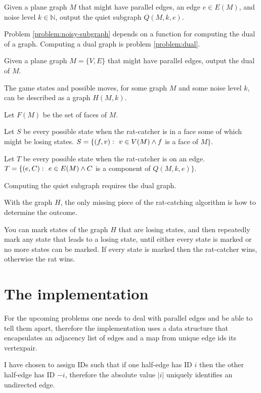 \documentclass{article}
\begin{document}
	\begin{problem}\label{problem:noisy-subgraph}
		Given a plane graph $M$ that might have parallel edges, an edge $e \in E(M)$, and noise level $k \in \mathbb{N}$, output the quiet subgraph $Q(M, k, e)$.
	\end{problem}

	Problem \ref{problem:noisy-subgraph} depends on a function for computing the dual of a graph. Computing a dual graph is problem \ref{problem:dual}.

	\begin{problem}\label{problem:dual}
		Given a plane graph $M = \{V, E\}$ that might have parallel edges, output the dual of $M$.
	\end{problem}

	

	The game states and possible moves, for some graph $M$ and some noise level $k$, can be described as a graph $H(M, k)$.

	Let $F(M)$ be the set of faces of $M$.

	Let $S$ be every possible state when the rat-catcher is in a face some of which might be losing states. $S = \{ (f, v) \,\colon\  v \in V(M) \land f$ is a face of $ M \}$.

	Let $T$ be every possible state when the rat-catcher is on an edge. $T = \{ (e, C) \,\colon\  e \in E(M) \land C$ is a component of $Q(M, k, e) \}$.

	Computing the quiet subgraph requires the dual graph. 
	
	With the graph $H$, the only missing piece of the rat-catching algorithm is how to determine the outcome.

	You can mark states of the graph $H$ that are losing states, and then repeatedly mark any state that leads to a losing state, until either every state is marked or no more states can be marked. If every state is marked then the rat-catcher wins, otherwise the rat wins.

\section{The implementation}

	For the upcoming problems one needs to deal with parallel edges and be able to tell them apart, therefore the implementation uses a data structure that encapsulates an adjacency list of edges and a map from unique edge ids its vertexpair.

	I have chosen to assign IDs such that if one half-edge has ID $i$ then the other half-edge has ID $-i$, therefore the absolute value $|i|$ uniquely identifies an undirected edge.
\end{document}
